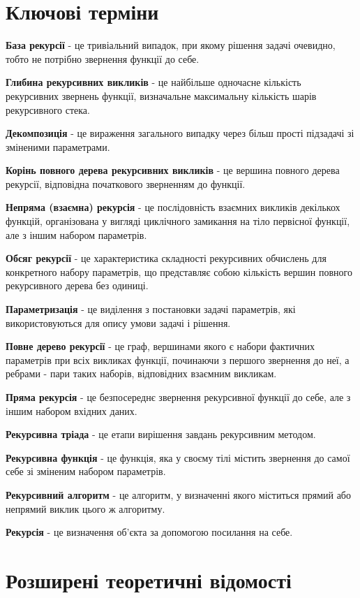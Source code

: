 \section{Ключові терміни}
\nopagebreak[4]


\textbf{База рекурсії} - це тривіальний випадок, при якому рішення задачі очевидно, тобто не потрібно звернення функції до себе.

\textbf{Глибина рекурсивних викликів} - це найбільше одночасне кількість рекурсивних звернень функції, визначальне максимальну кількість шарів рекурсивного стека.

\textbf{Декомпозиція} - це вираження загального випадку через більш прості підзадачі зі зміненими параметрами.

\textbf{Корінь повного дерева рекурсивних викликів} - це вершина повного дерева рекурсії, відповідна початкового зверненням до функції.

\textbf{Непряма (взаємна) рекурсія} - це послідовність взаємних викликів декількох функцій, організована у вигляді циклічного замикання на тіло первісної функції, але з іншим набором параметрів.

\textbf{Обсяг рекурсії} - це характеристика складності рекурсивних обчислень для конкретного набору параметрів, що представляє собою кількість вершин повного рекурсивного дерева без одиниці.

\textbf{Параметризація} - це виділення з постановки задачі параметрів, які використовуються для опису умови задачі і рішення.

\textbf{Повне дерево рекурсії} - це граф, вершинами якого є набори фактичних параметрів при всіх викликах функції, починаючи з першого звернення до неї, а ребрами - пари таких наборів, відповідних взаємним викликам.

\textbf{Пряма рекурсія} - це безпосереднє звернення рекурсивної функції до себе, але з іншим набором вхідних даних.

\textbf{Рекурсивна тріада} - це етапи вирішення завдань рекурсивним методом.

\textbf{Рекурсивна функція} - це функція, яка у своєму тілі містить звернення до самої себе зі зміненим набором параметрів.

\textbf{Рекурсивний алгоритм} - це алгоритм, у визначенні якого міститься прямий або непрямий виклик цього ж алгоритму.

\textbf{Рекурсія} - це визначення об'єкта за допомогою посилання на себе.


\section{Розширені теоретичні відомості}
\nopagebreak[4]


